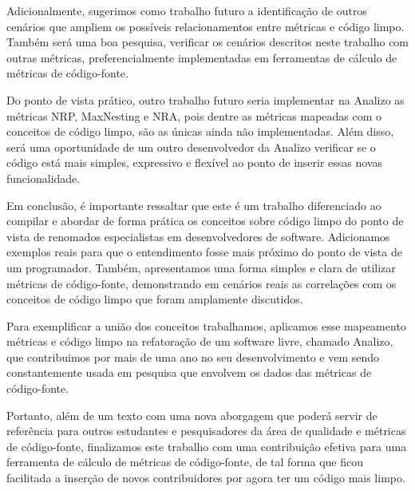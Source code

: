 Adicionalmente, sugerimos como trabalho futuro a identificação de outros cenários que ampliem os possíveis
relacionamentos entre métricas e código limpo. Também será uma boa pesquisa, verificar os cenários descritos neste 
trabalho com outras métricas, preferencialmente implementadas em ferramentas de cálculo de métricas
de código-fonte. 

Do ponto de vista prático, outro trabalho futuro seria implementar na Analizo as métricas NRP, MaxNesting e NRA,
pois dentre as métricas mapeadas com o conceitos de código limpo, são as únicas ainda não implementadas. Além 
disso, será uma oportunidade de um outro desenvolvedor da Analizo verificar se o código está mais simples, 
expressivo e flexível ao ponto de inserir essas novas funcionalidade.
 
Em conclusão, é importante ressaltar que este é um trabalho diferenciado ao compilar e abordar de forma prática os
conceitos sobre código limpo do ponto de vista de renomados especialistas em desenvolvedores de software. 
Adicionamos exemplos reais para que o entendimento fosse mais próximo do ponto de vista de um programador.
Também, apresentamos uma forma simples e clara de utilizar métricas de código-fonte, demonstrando em 
cenários reais as correlações com os conceitos de código limpo que foram amplamente discutidos.

Para exemplificar a união dos conceitos trabalhamos, aplicamos esse mapeamento métricas e código limpo na 
refatoração de um software livre, chamado Analizo, que contribuimos por mais de uma ano no seu desenvolvimento e vem 
sendo constantemente usada em pesquisa que envolvem os dados das métricas de código-fonte.

Portanto, além de um texto com uma nova aborgagem que poderá servir de referência para outros estudantes e 
pesquisadores da área de qualidade e métricas de código-fonte, finalizamos este trabalho com uma contribuição 
efetiva para uma ferramenta de cálculo de métricas de código-fonte, de tal forma que ficou facilitada
a inserção de novos contribuidores por agora ter um código mais limpo.
